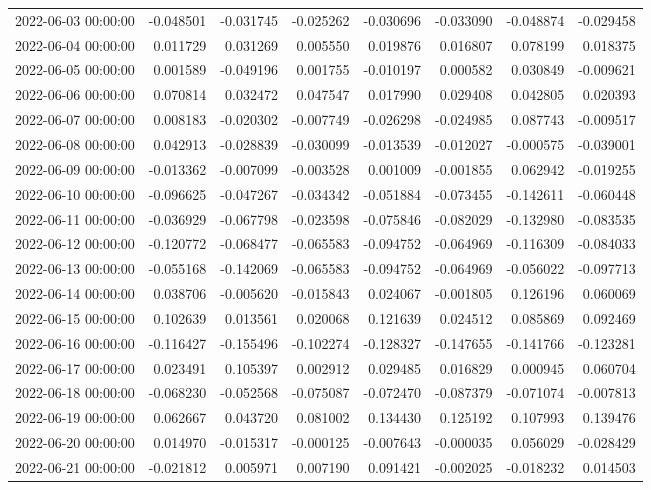 \begin{tabular}{lrrrrrrr}
2022-06-03 00:00:00 & -0.048501 & -0.031745 & -0.025262 & -0.030696 & -0.033090 & -0.048874 & -0.029458 \\
2022-06-04 00:00:00 & 0.011729 & 0.031269 & 0.005550 & 0.019876 & 0.016807 & 0.078199 & 0.018375 \\
2022-06-05 00:00:00 & 0.001589 & -0.049196 & 0.001755 & -0.010197 & 0.000582 & 0.030849 & -0.009621 \\
2022-06-06 00:00:00 & 0.070814 & 0.032472 & 0.047547 & 0.017990 & 0.029408 & 0.042805 & 0.020393 \\
2022-06-07 00:00:00 & 0.008183 & -0.020302 & -0.007749 & -0.026298 & -0.024985 & 0.087743 & -0.009517 \\
2022-06-08 00:00:00 & 0.042913 & -0.028839 & -0.030099 & -0.013539 & -0.012027 & -0.000575 & -0.039001 \\
2022-06-09 00:00:00 & -0.013362 & -0.007099 & -0.003528 & 0.001009 & -0.001855 & 0.062942 & -0.019255 \\
2022-06-10 00:00:00 & -0.096625 & -0.047267 & -0.034342 & -0.051884 & -0.073455 & -0.142611 & -0.060448 \\
2022-06-11 00:00:00 & -0.036929 & -0.067798 & -0.023598 & -0.075846 & -0.082029 & -0.132980 & -0.083535 \\
2022-06-12 00:00:00 & -0.120772 & -0.068477 & -0.065583 & -0.094752 & -0.064969 & -0.116309 & -0.084033 \\
2022-06-13 00:00:00 & -0.055168 & -0.142069 & -0.065583 & -0.094752 & -0.064969 & -0.056022 & -0.097713 \\
2022-06-14 00:00:00 & 0.038706 & -0.005620 & -0.015843 & 0.024067 & -0.001805 & 0.126196 & 0.060069 \\
2022-06-15 00:00:00 & 0.102639 & 0.013561 & 0.020068 & 0.121639 & 0.024512 & 0.085869 & 0.092469 \\
2022-06-16 00:00:00 & -0.116427 & -0.155496 & -0.102274 & -0.128327 & -0.147655 & -0.141766 & -0.123281 \\
2022-06-17 00:00:00 & 0.023491 & 0.105397 & 0.002912 & 0.029485 & 0.016829 & 0.000945 & 0.060704 \\
2022-06-18 00:00:00 & -0.068230 & -0.052568 & -0.075087 & -0.072470 & -0.087379 & -0.071074 & -0.007813 \\
2022-06-19 00:00:00 & 0.062667 & 0.043720 & 0.081002 & 0.134430 & 0.125192 & 0.107993 & 0.139476 \\
2022-06-20 00:00:00 & 0.014970 & -0.015317 & -0.000125 & -0.007643 & -0.000035 & 0.056029 & -0.028429 \\
2022-06-21 00:00:00 & -0.021812 & 0.005971 & 0.007190 & 0.091421 & -0.002025 & -0.018232 & 0.014503 \\

\end{tabular}
